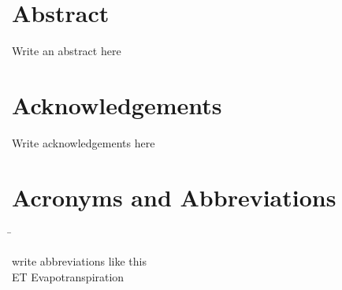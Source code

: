 


 



\chapter*{Abstract}
 
 Write an abstract here

 \cleardoublepage



\chapter*{Acknowledgements}

Write acknowledgements here

 \cleardoublepage


 \setcounter{tocdepth}{4}
 \tableofcontents

 \cleardoublepage


\chapter*{Acronyms and Abbreviations}\label{chap:symbole}


\begin{tabbing}
 \hspace*{3.2cm}  \= \kill

write abbreviations like this\\
ET\> Evapotranspiration\\



\end{tabbing}

 \cleardoublepage

